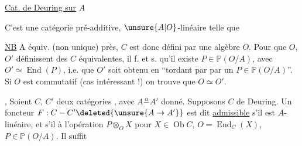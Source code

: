 
\uline{Cat. de Deuring sur} $A$

C'est une catégorie pré-additive, $\unsure{A|O}$-linéaire telle que

\uline{NB} A équiv. (non unique) près, $C$ est donc défini par une algèbre $O$. Pour que $O$, $O'$ définissent des $C$ équivalentes, il f. et s. qu'il existe $P\in\mathbb P(O/A)$, avec $O'\simeq\operatorname{End}(P)$, i.e. que $O'$ soit obtenu en ``tordant par  par un $P\in\mathbb P(O/A)$''. Si $O$ est commutatif (cas intéressant !) on trouve que $O\simeq O'$.

,
Soient $C$, $C'$ deux catégories , avec $A\overset{\alpha}{\mathbin{-}}A'$ donné. Supposons $C$ de Deuring. Un foncteur $F:C\mathbin{-}C'\deleted{\unsure{A\to A'}}$ est dit \uline{admissible}  s'il est $A$-linéaire, et s'il  à l'opération $P\otimes_O X$ pour $X\in\operatorname{Ob}C$, $O=\operatorname{End}_C(X)$, $P\in\mathbb P(O/A)$. Il suffit

